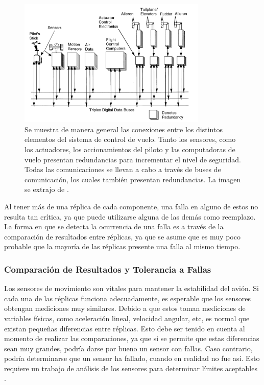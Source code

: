\begin{figure}[htb]
    \centering
    \includegraphics[width=0.8\textwidth]{img/diagrama_general_fly_by_wire.png}
    \caption{Se muestra de manera general las conexiones entre los distintos elementos del sistema de control de vuelo. Tanto los sensores, como los actuadores, los accionamientos del piloto y las computadoras de vuelo presentan redundancias para incrementar el nivel de seguridad. Todas las comunicaciones se llevan a cabo a través de buses de comunicación, los cuales también presentan redundancias. La imagen se extrajo de \cite{collinson2023introduction}.}
    \label{fig:diagrama_general_fly_by_wire}    
\end{figure}

Al tener más de una réplica de cada componente, una falla en alguno de estos no resulta tan crítica, ya que puede utilizarse alguna de las demás como reemplazo. La forma en que se detecta la ocurrencia de una falla es a través de la comparación de resultados entre réplicas, ya que se asume que es muy poco probable que la mayoría de las réplicas presente una falla al mismo tiempo.

\subsubsection{Comparación de Resultados y Tolerancia a Fallas}

Los sensores de movimiento son vitales para mantener la estabilidad del avión. Si cada una de las réplicas funciona adecuadamente, es esperable que los sensores obtengan mediciones muy similares. %
Debido a que estos toman mediciones de variables físicas, como aceleración lineal, velocidad angular, etc, es normal que existan pequeñas diferencias entre réplicas. Esto debe ser tenido en cuenta al momento de realizar las comparaciones, ya que si se permite que estas diferencias sean muy grandes, podría darse por bueno un sensor con fallas. Caso contrario, podría determinarse que un sensor ha fallado, cuando en realidad no fue así. Esto requiere un trabajo de análisis de los sensores para determinar límites aceptables \cite{lala1994architectural}.


